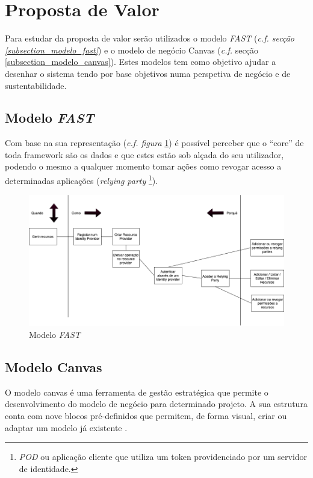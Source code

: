 \section{Proposta de Valor \label{section_proposta_de_valor}}
Para estudar da proposta de valor serão utilizados o modelo \emph{\acrshort{FAST}} (\emph{c.f. secção \ref{subsection_modelo_fast}}) e o modelo de negócio Canvas (\emph{c.f.} secção \ref{subsection_modelo_canvas}).
Estes modelos tem como objetivo ajudar a desenhar o sistema tendo por base objetivos numa perspetiva de negócio e de sustentabilidade.

\subsection{Modelo \emph{\acrshort{FAST}}\label{subsection_modelo_fast}}
Com base na sua representação (\emph{c.f. figura} \ref{figura_modelo_fast}) é possível perceber que o “core” de toda framework são os dados e que estes estão sob alçada do seu utilizador, podendo o mesmo a qualquer momento tomar ações como revogar acesso a determinadas aplicações (\emph{relying party} \footnote{\emph{\acrshort{POD}} ou aplicação cliente que utiliza um token providenciado por um servidor de identidade.}).

\begin{figure}[H]
    \begin{center}
    \includegraphics[height=0.4\textwidth]{figures/Canvas-FAST.png}
    \caption{Modelo \emph{\acrshort{FAST}}}
    \label{figura_modelo_fast}
    \end{center}
\end{figure}

\subsection{Modelo Canvas\label{subsection_modelo_canvas}}
O modelo canvas é uma ferramenta de gestão estratégica que permite o desenvolvimento do modelo de negócio para determinado projeto. A sua estrutura conta com nove blocos pré-definidos que permitem, de forma visual, criar ou adaptar um modelo já existente \cite{alexander:2006}.

